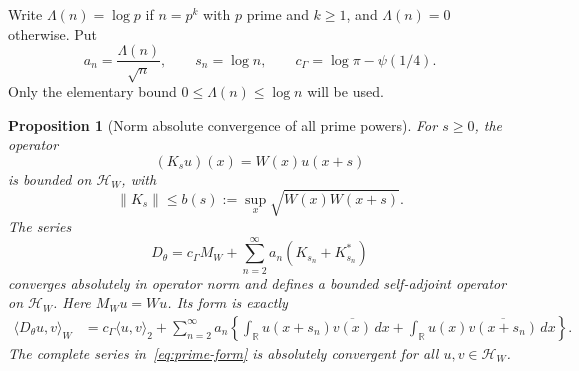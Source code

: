 \documentclass[11pt]{article}
\newtheorem{proposition}[theorem]{Proposition}
\theoremstyle{definition}
\theoremstyle{remark}
\newcommand{\R}{\mathbb R}
\newcommand{\HH}{\mathcal H_W}
\newcommand{\ip}[2]{\langle #1,#2\rangle}
\newcommand{\norm}[1]{\lVert #1\rVert}
\newcommand{\dd}{\,dx}
\begin{document}
Write $\Lambda(n)=\log p$ if $n=p^k$ with $p$ prime and $k\ge1$, and
$\Lambda(n)=0$ otherwise. Put
\begin{equation}\label{eq:prime-parameters}
 a_n=\frac{\Lambda(n)}{\sqrt n},\qquad s_n=\log n,
 \qquad c_\Gamma=\log\pi-\psi(1/4).
\end{equation}
Only the elementary bound $0\le\Lambda(n)\le\log n$ will be used.

\begin{proposition}[Norm absolute convergence of all prime powers]\label{prop:primes}
For $s\ge0$, the operator
\[
 (K_su)(x)=W(x)u(x+s)
\]
is bounded on $\HH$, with
\begin{equation}\label{eq:shift-norm}
 \norm{K_s}\le b(s):=\sup_x\sqrt{W(x)W(x+s)}.
\end{equation}
The series
\begin{equation}\label{eq:Db}
 D_\theta=c_\Gamma M_W+
 \sum_{n=2}^\infty a_n(K_{s_n}+K_{s_n}^*)
\end{equation}
converges absolutely in operator norm and defines a bounded self-adjoint
operator on $\HH$. Here $M_Wu=Wu$. Its form is exactly
\begin{align}\label{eq:prime-form}
 \ip{D_\theta u}{v}_W
 &=c_\Gamma\ip uv_2+\sum_{n=2}^\infty a_n
 \left\{\int_\R u(x+s_n)\overline{v(x)}\dd
 +\int_\R u(x)\overline{v(x+s_n)}\dd\right\}.
\end{align}
The complete series in~\eqref{eq:prime-form} is absolutely convergent for
all $u,v\in\HH$.
\end{proposition}
\end{document}
